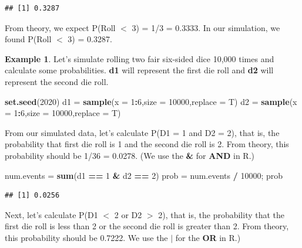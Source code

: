 \documentclass[
  11pt,
  oneside]{book}
\newenvironment{Shaded}{\begin{snugshade}}{\end{snugshade}}
\newcommand{\AttributeTok}[1]{\textcolor[rgb]{0.13,0.29,0.53}{#1}}
\newcommand{\DecValTok}[1]{\textcolor[rgb]{0.00,0.00,0.81}{#1}}
\newcommand{\FunctionTok}[1]{\textcolor[rgb]{0.13,0.29,0.53}{\textbf{#1}}}
\newcommand{\NormalTok}[1]{#1}
\newcommand{\OtherTok}[1]{\textcolor[rgb]{0.56,0.35,0.01}{#1}}
\newcommand{\SpecialCharTok}[1]{\textcolor[rgb]{0.81,0.36,0.00}{\textbf{#1}}}
\theoremstyle{definition}
\theoremstyle{definition}
\newtheorem{example}{Example}[chapter]
\theoremstyle{definition}
\theoremstyle{definition}
\theoremstyle{remark}
\begin{document}
\begin{verbatim}
## [1] 0.3287
\end{verbatim}

From theory, we expect P(Roll \(<\) 3) = 1/3 = 0.3333. In our simulation, we found P(Roll \(<\) 3) = 0.3287.

\newpage

\begin{example}
Let's simulate rolling two fair six-sided dice 10,000 times and calculate some probabilities. \textbf{d1} will represent the first die roll and \textbf{d2} will represent the second die roll.
\end{example}

\begin{Shaded}
\begin{Highlighting}[]
\FunctionTok{set.seed}\NormalTok{(}\DecValTok{2020}\NormalTok{)}
\NormalTok{d1 }\OtherTok{=} \FunctionTok{sample}\NormalTok{(}\AttributeTok{x =} \DecValTok{1}\SpecialCharTok{:}\DecValTok{6}\NormalTok{,}\AttributeTok{size =} \DecValTok{10000}\NormalTok{,}\AttributeTok{replace =}\NormalTok{ T)}
\NormalTok{d2 }\OtherTok{=} \FunctionTok{sample}\NormalTok{(}\AttributeTok{x =} \DecValTok{1}\SpecialCharTok{:}\DecValTok{6}\NormalTok{,}\AttributeTok{size =} \DecValTok{10000}\NormalTok{,}\AttributeTok{replace =}\NormalTok{ T)}
\end{Highlighting}
\end{Shaded}

From our simulated data, let's calculate P(D1 = 1 and D2 = 2), that is, the probability that first die roll is 1 and the second die roll is 2. From theory, this probability should be 1/36 = 0.0278. (We use the \textbf{\&} for \textbf{AND} in R.)

\begin{Shaded}
\begin{Highlighting}[]
\NormalTok{num.events }\OtherTok{=} \FunctionTok{sum}\NormalTok{(d1 }\SpecialCharTok{==} \DecValTok{1} \SpecialCharTok{\&}\NormalTok{ d2 }\SpecialCharTok{==} \DecValTok{2}\NormalTok{)}
\NormalTok{prob }\OtherTok{=}\NormalTok{ num.events }\SpecialCharTok{/} \DecValTok{10000}\NormalTok{; prob}
\end{Highlighting}
\end{Shaded}

\begin{verbatim}
## [1] 0.0256
\end{verbatim}

Next, let's calculate P(D1 \(<\) 2 or D2 \(>\) 2), that is, the probability that the first die roll is less than 2 or the second die roll is greater than 2. From theory, this probability should be 0.7222. We use the \textbf{$\vert$} for the \textbf{OR} in R.)
\end{document}
